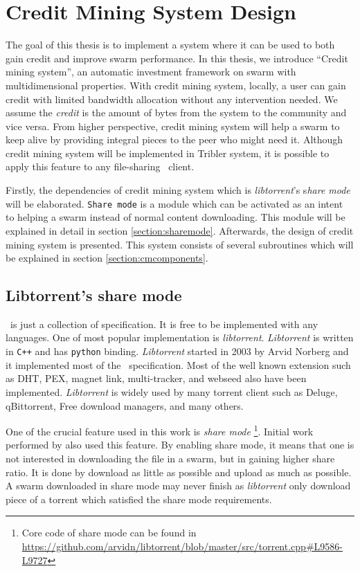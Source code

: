 \chapter{Credit Mining System Design}
\label{chp:design}

The goal of this thesis is to implement a system where it can be used to both gain credit and improve swarm performance. In this thesis, we introduce ``Credit mining system'', an automatic investment framework on swarm with multidimensional properties. With credit mining system, locally, a user can gain credit with limited bandwidth allocation without any intervention needed. We assume the \textit{credit} is the amount of bytes from the system to the community and vice versa. From higher perspective, credit mining system will help a swarm to keep alive by providing integral pieces to the peer who might need it. Although credit mining system will be implemented in Tribler system, it is possible to apply this feature to any file-sharing \bt~client.

Firstly, the dependencies of credit mining system which is \textit{libtorrent}'s s\textit{hare mode} will be elaborated. \texttt{Share mode} is a module which can be activated as an intent to helping a swarm instead of normal content downloading. This module will be explained in detail in section \ref{section:sharemode}. Afterwards, the design of credit mining system is presented. This system consists of several subroutines which will be explained in section \ref{section:cmcomponents}. 

\section{Libtorrent's share mode}
\label{section:libtorrent}
\label{section:sharemode}
\bt~is just a collection of specification. It is free to be implemented with any languages. One of most popular implementation is \textit{libtorrent}. \textit{Libtorrent} is written in \texttt{C++} and  has \texttt{python} binding. \textit{Libtorrent} started in 2003 by Arvid Norberg and it implemented most of the \bt~specification. Most of the well known extension such as DHT, PEX, magnet link, multi-tracker, and webseed also have been implemented. \textit{Libtorrent} is widely used by many torrent client such as Deluge, qBittorrent, Free download managers, and many others.

One of the crucial feature used in this work is \textit{share mode} \footnote{Core code of share mode can be found in \url{https://github.com/arvidn/libtorrent/blob/master/src/torrent.cpp\#L9586-L9727}}. Initial work performed by \citeauthor{2015:creditmining:capota} also used this feature\cite{2015:creditmining:capota}. By enabling share mode, it means that one is not interested in downloading the file in a swarm, but in gaining higher share ratio. It is done by download as little as possible and upload as much as possible. A swarm downloaded in share mode may never finish as \textit{libtorrent} only download piece of a torrent which satisfied the share mode requirements.

